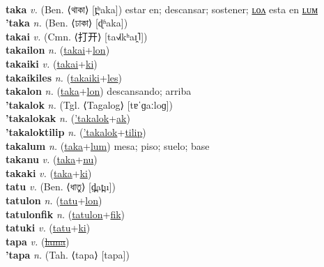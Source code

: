  \label{tafukuci} \\
\textbf{taka} \textit{v.} (Ben. ⟨থাকা⟩ [t̪ʰaka])
estar en; descansar; sostener; \hyperref[takalon]{ʟᴏᴧ} esta en \hyperref[takalum]{ʟᴜᴍ} \label{taka} \\
\textbf{'taka} \textit{n.} (Ben. ⟨ঢাকা⟩ [ɖʱaka])
 \label{'taka} \\
\textbf{takai} \textit{v.} (Cmn. ⟨打开⟩ [ta˧˩˧kʰaɪ̯˥])
 \label{takai} \\
\textbf{takailon} \textit{n.} (\hyperref[takai]{takai}+\hyperref[lon]{lon})
 \label{takailon} \\
\textbf{takaiki} \textit{v.} (\hyperref[takai]{takai}+\hyperref[ki]{ki})
 \label{takaiki} \\
\textbf{takaikiles} \textit{n.} (\hyperref[takaiki]{takaiki}+\hyperref[les]{les})
 \label{takaikiles} \\
\textbf{takalon} \textit{n.} (\hyperref[taka]{taka}+\hyperref[lon]{lon})
descansando; arriba \label{takalon} \\
\textbf{'takalok} \textit{n.} (Tgl. ⟨Tagalog⟩ [tɐˈɡaːloɡ])
 \label{'takalok} \\
\textbf{'takalokak} \textit{n.} (\hyperref['takalok]{'takalok}+\hyperref[ak]{ak})
 \label{'takalokak} \\
\textbf{'takaloktilip} \textit{n.} (\hyperref['takalok]{'takalok}+\hyperref[tilip]{tilip})
 \label{'takaloktilip} \\
\textbf{takalum} \textit{n.} (\hyperref[taka]{taka}+\hyperref[lum]{lum})
mesa; piso; suelo; base \label{takalum} \\
\textbf{takanu} \textit{v.} (\hyperref[taka]{taka}+\hyperref[nu]{nu})
 \label{takanu} \\
\textbf{takaki} \textit{v.} (\hyperref[taka]{taka}+\hyperref[ki]{ki})
 \label{takaki} \\
\textbf{tatu} \textit{v.} (Ben. ⟨ধাতু⟩ [d̪̤at̪u])
 \label{tatu} \\
\textbf{tatulon} \textit{n.} (\hyperref[tatu]{tatu}+\hyperref[lon]{lon})
 \label{tatulon} \\
\textbf{tatulonfik} \textit{n.} (\hyperref[tatulon]{tatulon}+\hyperref[fik]{fik})
 \label{tatulonfik} \\
\textbf{tatuki} \textit{v.} (\hyperref[tatu]{tatu}+\hyperref[ki]{ki})
 \label{tatuki} \\
\textbf{tapa} \textit{v.} (\hyperref[lama]{\sout{lama}})
 \label{tapa} \\
\textbf{'tapa} \textit{n.} (Tah. ⟨tapa⟩ [tapa])
 \label{'tapa} \\
